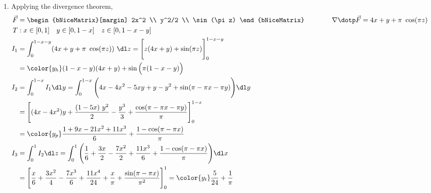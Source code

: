 \begin{enumerate}
    \item Applying the divergence theorem,
          \begin{align}
              \vec{F} & = \begin{bNiceMatrix}[margin]
                              2x^2 \\ y^2/2 \\ \sin(\pi z)
                          \end{bNiceMatrix} \qquad\qquad
              \nabla \dotp \vec{F} = 4x + y + \pi\ \cos(\pi z)                     \\
              T       & : x \in [0, 1] \quad y \in [0, 1-x] \quad z \in [0, 1-x-y] \\
              I_1     & = \int_{0}^{1-x-y} (4x + y + \pi\ \cos(\pi z))\ \dl z
              = \Bigg[ z(4x + y) + \sin(\pi z) \Bigg]_{0}^{1-x-y}                  \\
                      & = {\color{y_h} (1 - x - y)(4x + y)
              + \sin \Big(\pi(1-x-y)\Big)}                                         \\
              I_2     & = \int_{0}^{1-x}I_1 \dl y = \int_{0}^{1-x}
              \Bigg( 4x - 4x^2 - 5xy + y - y^2 + \sin(\pi - \pi x - \pi y)
              \Bigg) \dl y                                                         \\
                      & = \Bigg[ (4x - 4x^2)y + \frac{(1 - 5x)\ y^2}{2}
                  -\frac{y^3}{3} + \frac{\cos(\pi - \pi x - \pi y)}{\pi}
              \Bigg]_{0}^{1-x}                                                     \\
                      & = {\color{y_p} \frac{1 + 9x - 21x^2 + 11x^3}{6}
              + \frac{1 - \cos(\pi - \pi x)}{\pi}}                                 \\
              I_3     & = \int_{0}^{1} I_2 \dl z = \int_{0}^{1}
              \Bigg( \frac{1}{6} + \frac{3x}{2} - \frac{7x^2}{2}
              + \frac{11x^3}{6} + \frac{1 - \cos(\pi - \pi x)}{\pi} \Bigg) \dl x   \\
                      & = \Bigg[ \frac{x}{6} + \frac{3x^2}{4} - \frac{7x^3}{6}
                  + \frac{11x^4}{24} + \frac{x}{\pi}
                  + \frac{\sin(\pi - \pi x)}{\pi^2} \Bigg]_0^1
              = {\color{y_t} \frac{5}{24} + \frac{1}{\pi}}
          \end{align}


\end{enumerate}
